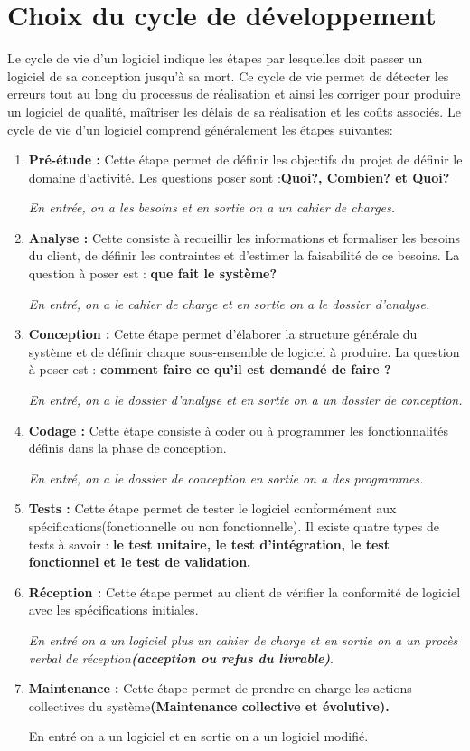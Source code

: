 	\section{Choix du cycle de développement}
		Le cycle de vie d'un logiciel indique les étapes par lesquelles doit passer un logiciel de sa conception jusqu'à sa mort. Ce cycle de vie permet de détecter les erreurs tout au long du processus de réalisation et ainsi les corriger pour produire un logiciel de qualité, maîtriser les délais de sa réalisation et les coûts associés.
		Le cycle de vie d'un logiciel comprend généralement les étapes suivantes:
		\begin{enumerate}
			\item \textbf{Pré-étude :} Cette étape permet de définir les objectifs du projet de définir le domaine d'activité. Les questions poser sont :\textbf{Quoi?, Combien? et Quoi?}
			
			\textit{En entrée, on a les besoins et en sortie on a un cahier de charges.}
			\item \textbf{Analyse : } Cette consiste à recueillir les informations et formaliser les besoins du client, de définir les contraintes et d'estimer la faisabilité de ce besoins. La question à poser est : \textbf{que fait le système?}
			
			\textit{En entré, on a le cahier de charge et en sortie on a le dossier d'analyse.}
			
			\item \textbf{Conception :} Cette étape permet d'élaborer la structure générale du système et de définir chaque sous-ensemble de logiciel à produire. La question à poser est : \textbf{comment faire ce qu'il est demandé de faire ?}
			
			\textit{En entré, on a le dossier d'analyse et en sortie on a un dossier de conception.}
			\item \textbf{Codage : }Cette étape consiste à coder ou à programmer les fonctionnalités définis dans la phase de conception.
			
			\textit{En entré, on a le dossier de conception en sortie on a des programmes.}
			\item \textbf{Tests : }Cette étape permet de tester le logiciel conformément aux spécifications(fonctionnelle ou non fonctionnelle). Il existe quatre types de tests à savoir :\textbf{ le test unitaire, le test d'intégration, le test fonctionnel et le test de validation.}
			
			\item \textbf{Réception : } Cette étape permet au client de vérifier la conformité de logiciel avec les spécifications initiales.
			
			\textit{En entré on a un logiciel plus un cahier de charge et en sortie on a un procès verbal de réception\textbf{(acception ou refus du livrable)}}.
			
			\item \textbf{Maintenance : } Cette étape permet de prendre en charge les actions collectives du système\textbf{(Maintenance collective et évolutive).}
			
			En entré on a un logiciel et en sortie on a un logiciel modifié.
					\end{enumerate}
					
